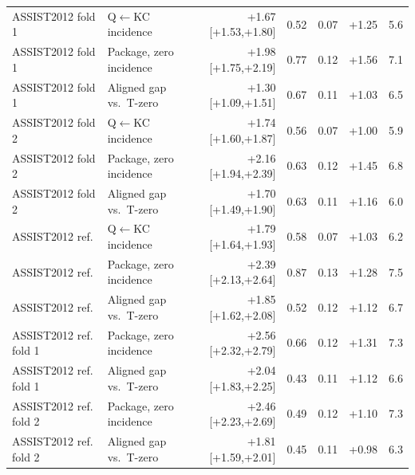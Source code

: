 \begin{table}[H]
\begin{tabular}{@{}llrrrrr@{}}
ASSIST2012 fold 1 & Q$\leftarrow$KC incidence & +1.67 [+1.53,+1.80] & 0.52 & 0.07 & +1.25 & 5.6 \\
ASSIST2012 fold 1 & Package, zero incidence & +1.98 [+1.75,+2.19] & 0.77 & 0.12 & +1.56 & 7.1 \\
ASSIST2012 fold 1 & Aligned gap vs.\ T-zero & +1.30 [+1.09,+1.51] & 0.67 & 0.11 & +1.03 & 6.5 \\
ASSIST2012 fold 2 & Q$\leftarrow$KC incidence & +1.74 [+1.60,+1.87] & 0.56 & 0.07 & +1.00 & 5.9 \\
ASSIST2012 fold 2 & Package, zero incidence & +2.16 [+1.94,+2.39] & 0.63 & 0.12 & +1.45 & 6.8 \\
ASSIST2012 fold 2 & Aligned gap vs.\ T-zero & +1.70 [+1.49,+1.90] & 0.63 & 0.11 & +1.16 & 6.0 \\
ASSIST2012 ref. & Q$\leftarrow$KC incidence & +1.79 [+1.64,+1.93] & 0.58 & 0.07 & +1.03 & 6.2 \\
ASSIST2012 ref. & Package, zero incidence & +2.39 [+2.13,+2.64] & 0.87 & 0.13 & +1.28 & 7.5 \\
ASSIST2012 ref. & Aligned gap vs.\ T-zero & +1.85 [+1.62,+2.08] & 0.52 & 0.12 & +1.12 & 6.7 \\
ASSIST2012 ref. fold 1 & Package, zero incidence & +2.56 [+2.32,+2.79] & 0.66 & 0.12 & +1.31 & 7.3 \\
ASSIST2012 ref. fold 1 & Aligned gap vs.\ T-zero & +2.04 [+1.83,+2.25] & 0.43 & 0.11 & +1.12 & 6.6 \\
ASSIST2012 ref. fold 2 & Package, zero incidence & +2.46 [+2.23,+2.69] & 0.49 & 0.12 & +1.10 & 7.3 \\
ASSIST2012 ref. fold 2 & Aligned gap vs.\ T-zero & +1.81 [+1.59,+2.01] & 0.45 & 0.11 & +0.98 & 6.3 \\
\bottomrule
\end{tabular}
\end{table}
